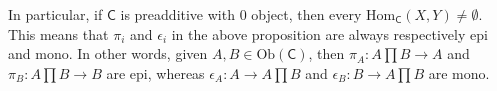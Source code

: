 \begin{cor}
	In particular, if $\mathsf{C}$ is preadditive with $0$ object, then every $\mathrm{Hom}_{\mathsf{C}} \left( X, Y \right) \neq \emptyset$.
	This means that $\pi_i$ and $\epsilon_i$ in the above proposition are always respectively epi and mono.
	In other words, given $A, B \in \mathrm{Ob} \left(\mathsf{C}\right)$, then 
	$\pi_A: A \prod B \to A$ and $\pi_B: A \prod B \to B$ are epi, whereas
	$\epsilon_A: A \to A \prod B$ and $\epsilon_B: B \to A \prod B$ are mono.
\end{cor} 

